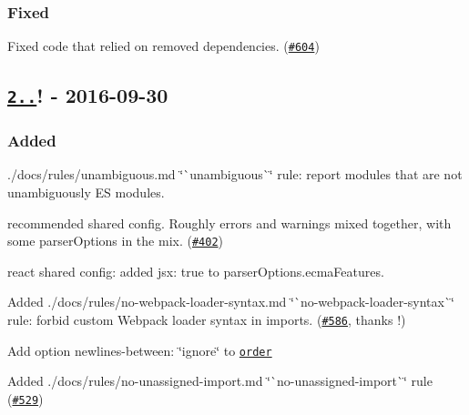 \subsubsection*{Fixed}


\begin{DoxyItemize}
\item Fixed code that relied on removed dependencies. (\href{https://github.com/benmosher/eslint-plugin-import/issues/604}{\tt \#604})
\end{DoxyItemize}

\subsection*{\href{https://github.com/benmosher/eslint-plugin-import/compare/v1.16.0...v2.0.0}{\tt 2..}! -\/ 2016-\/09-\/30}

\subsubsection*{Added}


\begin{DoxyItemize}
\item ./docs/rules/unambiguous.md \char`\"{}\`{}unambiguous\`{}\char`\"{} rule\+: report modules that are not unambiguously ES modules.
\item {\ttfamily recommended} shared config. Roughly {\ttfamily errors} and {\ttfamily warnings} mixed together, with some {\ttfamily parser\+Options} in the mix. (\href{https://github.com/benmosher/eslint-plugin-import/issues/402}{\tt \#402})
\item {\ttfamily react} shared config\+: added {\ttfamily jsx\+: true} to {\ttfamily parser\+Options.\+ecma\+Features}.
\item Added ./docs/rules/no-\/webpack-\/loader-\/syntax.md \char`\"{}\`{}no-\/webpack-\/loader-\/syntax\`{}\char`\"{} rule\+: forbid custom Webpack loader syntax in imports. (\href{https://github.com/benmosher/eslint-plugin-import/pull/586}{\tt \#586}, thanks \href{https://github.com/fson}{\tt }!)
\item Add option {\ttfamily newlines-\/between\+: \char`\"{}ignore\char`\"{}} to \href{[#519]}{\tt {\ttfamily order}}
\item Added ./docs/rules/no-\/unassigned-\/import.md \char`\"{}\`{}no-\/unassigned-\/import\`{}\char`\"{} rule (\href{https://github.com/benmosher/eslint-plugin-import/issues/529}{\tt \#529})
\end{DoxyItemize}

